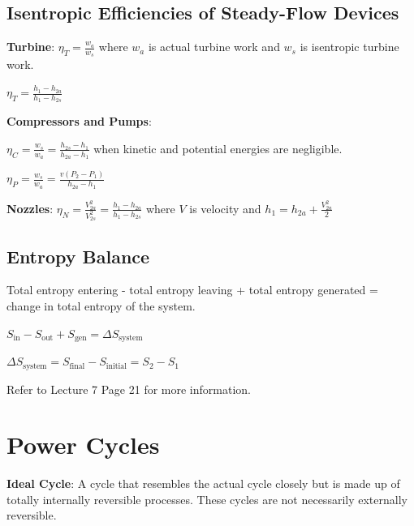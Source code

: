 \documentclass{article}
\begin{document}
\begin{multicols}{3}
    \subsection*{Isentropic Efficiencies of Steady-Flow Devices}
    \textbf{Turbine}: $\eta_T=\frac{w_a}{w_s}$ where $w_a$ is actual turbine work and $w_s$ is isentropic turbine work.\par 
    $\eta_T=\frac{h_1-h_{2a}}{h_1-h_{2s}}$\par 
    \textbf{Compressors and Pumps}: \par 
    $\eta_C=\frac{w_s}{w_a}=\frac{h_{2s}-h_1}{h_{2a}-h_1}$ when kinetic and potential energies are negligible.\par 
    $\eta_P=\frac{w_s}{w_a}=\frac{v(P_2-P_1)}{h_{2a}-h_1}$\par 
    \textbf{Nozzles}: $\eta_N=\frac{V_{2a}^2}{V_{2s}^2}=\frac{h_1-h_{2a}}{h_1-h_{2s}}$ where $V$ is velocity and $h_1=h_{2a}+\frac{V_{2a}^2}{2}$
    \subsection*{Entropy Balance}
    Total entropy entering - total entropy leaving + total entropy generated = change in total entropy of the system.\par 
    $S_\text{in}-S_\text{out}+S_\text{gen}=\Delta S_\text{system}$\par 
    $\Delta S_\text{system}=S_\text{final}-S_\text{initial}=S_2-S_1$\par 
    Refer to Lecture 7 Page 21 for more information.

     \section*{Power Cycles}
     \textbf{Ideal Cycle}: A cycle that resembles the actual cycle closely but is made up of totally internally reversible processes. These cycles are not necessarily externally reversible.

\end{multicols}
\end{document}
